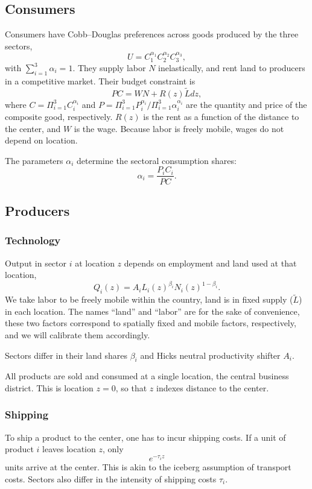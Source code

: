 \documentclass[12pt]{article}
\begin{document}
\subsection{Consumers}
Consumers have Cobb--Douglas preferences across goods produced by the three sectors,
\begin{equation}
\label{eq:Utility}
U = C_1^{\alpha_1}C_2^{\alpha_2}C_3^{\alpha_3},
\end{equation}
with $\sum_{i=1}^3\alpha_i=1$. They supply labor $N$ inelastically, and rent land to producers in a competitive market. Their budget constraint is
\begin{equation}
\label{eq:BudCons}
PC=WN+R(z)\tilde{L}dz,
\end{equation}
where $C=\Pi_{i=1}^3C_i^{\alpha_i}$ and $P=\Pi_{i=1}^3P_i^{\alpha_i}/\Pi_{i=1}^3\alpha_i^{\alpha_i}$ are the quantity and price of the composite good, respectively. $R(z)$ is the rent as a function of the distance to the center, and $W$ is the wage. Because labor is freely mobile, wages do not depend on location.

The parameters $\alpha_i$ determine the sectoral consumption shares:
\begin{equation*}
\alpha_i=\frac{P_iC_i}{PC}.
\end{equation*}

\subsection{Producers}
\subsubsection{Technology}
Output in sector $i$ at location $z$ depends on employment and land used at that location,
\[
Q_i(z) = A_i L_i(z)^{\beta_i}N_i(z)^{1-\beta_i}.
\]
We take labor to be freely mobile within the country, land is in fixed supply ($\tilde{L}$) in each location. The names ``land'' and ``labor'' are for the sake of convenience, these two factors correspond to spatially fixed and mobile factors, respectively, and we will calibrate them accordingly.

Sectors differ in their land shares $\beta_i$ and Hicks neutral productivity shifter $A_i$.

All products are sold and consumed at a single location, the central business district. This is location $z=0$, so that $z$ indexes distance to the center.

\subsubsection{Shipping}
To ship a product to the center, one has to incur shipping costs. If a unit of product $i$ leaves location $z$, only
\[
e^{-\tau_i z}
\]
units arrive at the center. This is akin to the iceberg assumption of transport costs. Sectors also differ in the intensity of shipping costs $\tau_i$.
\end{document}
